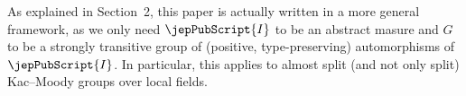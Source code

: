 \begin{remark*}
As explained in Section~2, this paper is actually written in a more general framework, as we only need $\jepPubScript{I}$ to be an abstract masure and $G$ to be a strongly transitive group of (positive, type-preserving) automorphisms of $\jepPubScript{I}$. In particular, this applies to almost split (and not only split) Kac--Moody groups over local fields.
\end{remark*}
